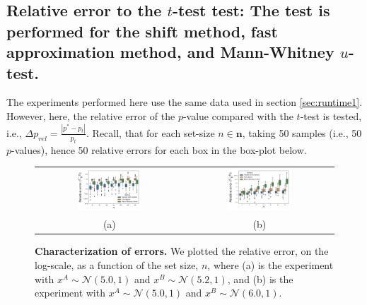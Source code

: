 \documentclass[a4paper]{article}
\begin{document}
\subsection{Relative error to the $t$-test test: The test is performed for the shift method, fast approximation method, and Mann-Whitney $u$-test.}

    
The experiments performed here use the same data used in section \ref{sec:runtime1}. However, here, the relative error of the $p$-value compared with the $t$-test is tested, i.e.,  $\Delta p _{rel} = \frac{|p^{*}-p_{t}|}{p_{t}}$. Recall, that for each set-size $n \in \mathbf{n}$, taking 50 samples (i.e., 50 $p$-values), hence 50 relative errors for each box in the box-plot below.

\begin{figure}[H]
  \centering
  \begin{tabular}{cc}
  \includegraphics[width=0.45\textwidth]{figures/SNSfastPermMultipleBox5_2.png} &  \includegraphics[width=0.45\textwidth]{figures/SNSfastPermMultipleBox6_0.png} \\
  (a) & (b)
  \end{tabular}
  \caption{{\bf Characterization of errors.} We plotted the relative error, on the log-scale, as a function of the set size, $n$, where (a) is the experiment with $x^{A} \sim \mathcal{N}(5.0,1)$ and $x^{B} \sim \mathcal{N}(5.2,1)$, and (b) is the experiment with $x^{A} \sim \mathcal{N}(5.0,1)$ and $x^{B} \sim \mathcal{N}(6.0,1)$.\label{fig:relerror}}
\end{figure}
\end{document}
